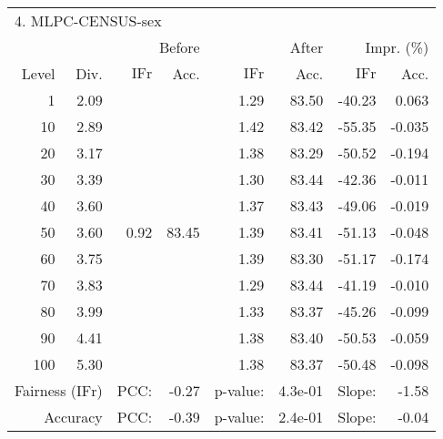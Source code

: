 \begin{tabular}{rr||rr|rr|rr}
\multicolumn{4}{l}{4. MLPC-CENSUS-sex} & \multicolumn{2}{c}{} & \multicolumn{2}{c}{}\\
 &  & \multicolumn{2}{r|}{Before} & \multicolumn{2}{r|}{After} & \multicolumn{2}{r}{Impr. (\%)}\\
Level & Div. & $\mathrm{IFr}$ & Acc. & $\mathrm{IFr}$ & Acc. & $\mathrm{IFr}$ & Acc.\\
\hline
1 & 2.09 & \multirow{11}{*}{0.92} & \multirow{11}{*}{83.45} & 1.29 & 83.50 & -40.23 & 0.063\\
10 & 2.89 &  &  & 1.42 & 83.42 & -55.35 & -0.035\\
20 & 3.17 &  &  & 1.38 & 83.29 & -50.52 & -0.194\\
30 & 3.39 &  &  & 1.30 & 83.44 & -42.36 & -0.011\\
40 & 3.60 &  &  & 1.37 & 83.43 & -49.06 & -0.019\\
50 & 3.60 &  &  & 1.39 & 83.41 & -51.13 & -0.048\\
60 & 3.75 &  &  & 1.39 & 83.30 & -51.17 & -0.174\\
70 & 3.83 &  &  & 1.29 & 83.44 & -41.19 & -0.010\\
80 & 3.99 &  &  & 1.33 & 83.37 & -45.26 & -0.099\\
90 & 4.41 &  &  & 1.38 & 83.40 & -50.53 & -0.059\\
100 & 5.30 &  &  & 1.38 & 83.37 & -50.48 & -0.098\\
\hline
\multicolumn{2}{r}{Fairness ($\mathrm{IFr}$)} & PCC: & \multicolumn{1}{r}{-0.27} & p-value:  & \multicolumn{1}{r}{4.3e-01} & Slope:  & -1.58\\
\multicolumn{2}{r}{Accuracy} & PCC: & \multicolumn{1}{r}{-0.39} & p-value:  & \multicolumn{1}{r}{2.4e-01} & Slope:  & -0.04\\
\end{tabular}